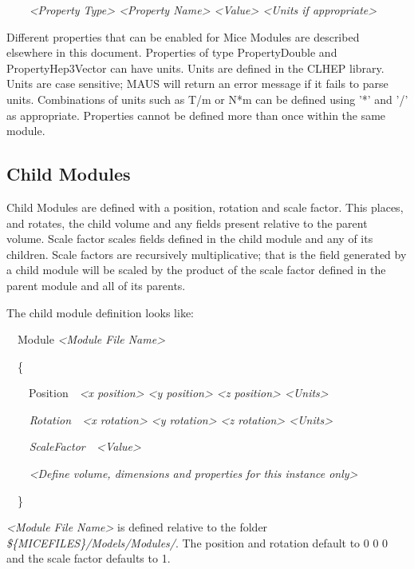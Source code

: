 {\ttfamily\itshape
\ \ \ \ {\textless}Property Type{\textgreater} {\textless}Property Name{\textgreater} {\textless}Value{\textgreater}
{\textless}Units if appropriate{\textgreater}}

Different properties that can be enabled for Mice Modules are described elsewhere in this document. Properties of type
PropertyDouble and PropertyHep3Vector can have units. Units are defined in the CLHEP library. Units are case sensitive;
MAUS will return an error message if it fails to parse units. Combinations of units such as T/m or N*m can be defined
using '*' and '/' as appropriate. Properties cannot be defined more than once within the same module.

\subsection{Child Modules}
Child Modules are defined with a position, rotation and scale factor. This places, and rotates, the child volume and any
fields present relative to the parent volume. Scale factor scales fields defined in the child module and any of its
children. Scale factors are recursively multiplicative; that is the field generated by a child module will be scaled by
the product of the scale factor defined in the parent module and all of its parents.

The child module definition looks like:

{\ttfamily
\ \ Module \textit{{\textless}Module File Name{\textgreater}}}

{\ttfamily
\ \ \{}

{\ttfamily
\ \ \ \ Position\ \ \textit{{\textless}x position{\textgreater} {\textless}y position{\textgreater} {\textless}z
position{\textgreater} {\textless}Units{\textgreater}}}

{\ttfamily\itshape
\ \ \ \ \textup{Rotation\ \ }{\textless}x rotation{\textgreater} {\textless}y rotation{\textgreater} {\textless}z
rotation{\textgreater} {\textless}Units{\textgreater}}

{\ttfamily\itshape
\ \ \ \ \textup{ScaleFactor\ \ }{\textless}Value{\textgreater}}

{\ttfamily\itshape
\ \ \ \ {\textless}Define volume, dimensions and properties for this instance only{\textgreater}}

{\ttfamily
\ \ \}}

\textit{{\textless}Module File Name{\textgreater}} is defined relative to the folder
\textit{\$\{MICEFILES\}/Models/Modules/}. The position and rotation default to 0 0 0 and the scale factor defaults to
1.

